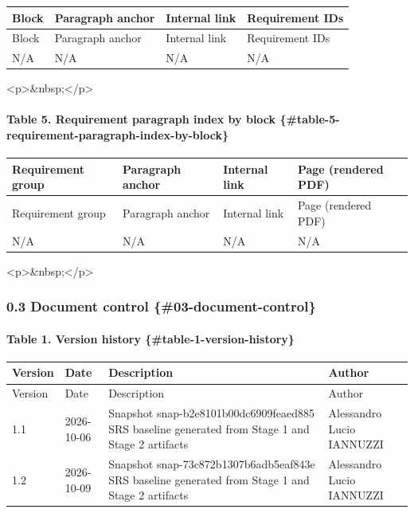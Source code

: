 \documentclass[11pt]{article}
\begin{document}
\begin{longtable}{|p{}|p{}|p{}|p{}|}
\hline
Block & Paragraph anchor & Internal link & Requirement IDs \\
\hline
\endfirsthead
\hline
Block & Paragraph anchor & Internal link & Requirement IDs \\
\hline
\endhead
N/A & N/A & N/A & N/A \\
\hline
\end{longtable}


<p>\&nbsp;</p>

\paragraph{Table 5. Requirement paragraph index by block \{\#table-5-requirement-paragraph-index-by-block\}}


\begin{longtable}{|p{}|p{}|p{}|p{}|}
\hline
Requirement group & Paragraph anchor & Internal link & Page (rendered PDF) \\
\hline
\endfirsthead
\hline
Requirement group & Paragraph anchor & Internal link & Page (rendered PDF) \\
\hline
\endhead
N/A & N/A & N/A & N/A \\
\hline
\end{longtable}


<p>\&nbsp;</p>

\subsubsection{0.3 Document control \{\#03-document-control\}}


\paragraph{Table 1. Version history \{\#table-1-version-history\}}


\begin{longtable}{|p{}|p{}|p{}|p{}|}
\hline
Version & Date & Description & Author \\
\hline
\endfirsthead
\hline
Version & Date & Description & Author \\
\hline
\endhead
1.1 & 2026-10-06 & Snapshot snap-b2e8101b00dc6909feaed885 SRS baseline generated from Stage 1 and Stage 2 artifacts & Alessandro Lucio IANNUZZI \\
\hline
1.2 & 2026-10-09 & Snapshot snap-73c872b1307b6adb5eaf843e SRS baseline generated from Stage 1 and Stage 2 artifacts & Alessandro Lucio IANNUZZI \\
\hline
\end{longtable}
\end{document}

